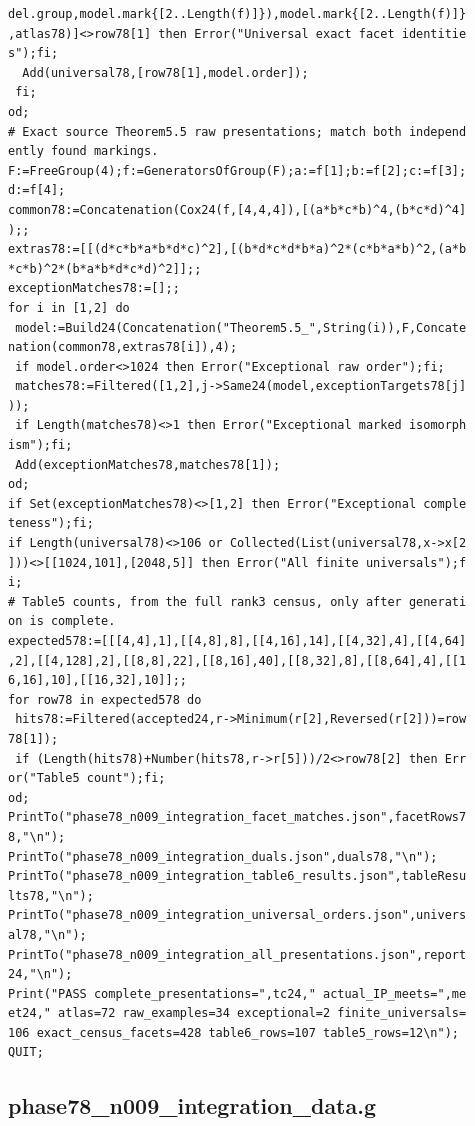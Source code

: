 \documentclass[
  11pt,
  a4paper,
]{article}
\begin{document}
\begin{verbatim}
del.group,model.mark{[2..Length(f)]}),model.mark{[2..Length(f)]}
,atlas78)]<>row78[1] then Error("Universal exact facet identitie
s");fi;
  Add(universal78,[row78[1],model.order]);
 fi;
od;
# Exact source Theorem5.5 raw presentations; match both independ
ently found markings.
F:=FreeGroup(4);f:=GeneratorsOfGroup(F);a:=f[1];b:=f[2];c:=f[3];
d:=f[4];
common78:=Concatenation(Cox24(f,[4,4,4]),[(a*b*c*b)^4,(b*c*d)^4]
);;
extras78:=[[(d*c*b*a*b*d*c)^2],[(b*d*c*d*b*a)^2*(c*b*a*b)^2,(a*b
*c*b)^2*(b*a*b*d*c*d)^2]];;
exceptionMatches78:=[];;
for i in [1,2] do
 model:=Build24(Concatenation("Theorem5.5_",String(i)),F,Concate
nation(common78,extras78[i]),4);
 if model.order<>1024 then Error("Exceptional raw order");fi;
 matches78:=Filtered([1,2],j->Same24(model,exceptionTargets78[j]
));
 if Length(matches78)<>1 then Error("Exceptional marked isomorph
ism");fi;
 Add(exceptionMatches78,matches78[1]);
od;
if Set(exceptionMatches78)<>[1,2] then Error("Exceptional comple
teness");fi;
if Length(universal78)<>106 or Collected(List(universal78,x->x[2
]))<>[[1024,101],[2048,5]] then Error("All finite universals");f
i;
# Table5 counts, from the full rank3 census, only after generati
on is complete.
expected578:=[[[4,4],1],[[4,8],8],[[4,16],14],[[4,32],4],[[4,64]
,2],[[4,128],2],[[8,8],22],[[8,16],40],[[8,32],8],[[8,64],4],[[1
6,16],10],[[16,32],10]];;
for row78 in expected578 do
 hits78:=Filtered(accepted24,r->Minimum(r[2],Reversed(r[2]))=row
78[1]);
 if (Length(hits78)+Number(hits78,r->r[5]))/2<>row78[2] then Err
or("Table5 count");fi;
od;
PrintTo("phase78_n009_integration_facet_matches.json",facetRows7
8,"\n");
PrintTo("phase78_n009_integration_duals.json",duals78,"\n");
PrintTo("phase78_n009_integration_table6_results.json",tableResu
lts78,"\n");
PrintTo("phase78_n009_integration_universal_orders.json",univers
al78,"\n");
PrintTo("phase78_n009_integration_all_presentations.json",report
24,"\n");
Print("PASS complete_presentations=",tc24," actual_IP_meets=",me
et24," atlas=72 raw_examples=34 exceptional=2 finite_universals=
106 exact_census_facets=428 table6_rows=107 table5_rows=12\n");
QUIT;
\end{verbatim}

\subsection{phase78\_n009\_integration\_data.g}\label{phase78_n009_integration_data.g}
\end{document}

